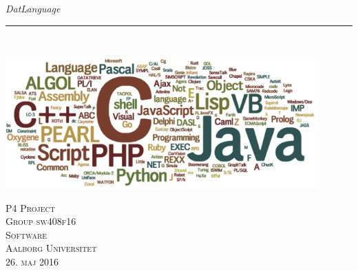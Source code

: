 \thispagestyle{empty}
\begin{flushright}
\vspace{3cm}

\phantom{hul}

\phantom{hul}

\phantom{hul}

\textsl{\Huge DatLanguage} \\ \vspace{1cm}

\rule{13cm}{3mm} \\ \vspace{1.5cm}
\vspace{1cm}

\includegraphics[width=0.9\textwidth]{billeder/Prog-languages}

\vspace{7cm} 
\textsc{\Large P4 Project \\
Group sw408f16 \\
Software\\
Aalborg Universitet\\
26. maj 2016\\}
\end{flushright}
